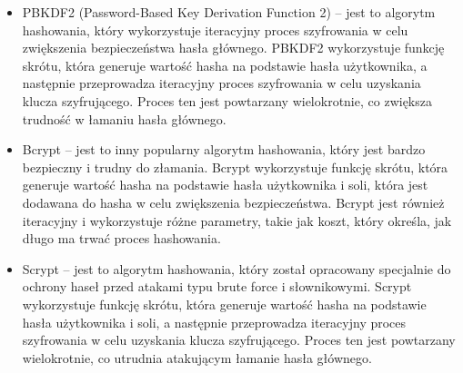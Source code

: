 \begin{itemize}
    \item PBKDF2 (Password-Based Key Derivation Function 2) – jest to algorytm hashowania, który wykorzystuje iteracyjny proces szyfrowania w celu zwiększenia bezpieczeństwa hasła głównego. PBKDF2 wykorzystuje funkcję skrótu, która generuje wartość hasha na podstawie hasła użytkownika, a następnie przeprowadza iteracyjny proces szyfrowania w celu uzyskania klucza szyfrującego. Proces ten jest powtarzany wielokrotnie, co zwiększa trudność w łamaniu hasła głównego.
    \item Bcrypt – jest to inny popularny algorytm hashowania, który jest bardzo bezpieczny i trudny do złamania. Bcrypt wykorzystuje funkcję skrótu, która generuje wartość hasha na podstawie hasła użytkownika i soli, która jest dodawana do hasha w celu zwiększenia bezpieczeństwa. Bcrypt jest również iteracyjny i wykorzystuje różne parametry, takie jak koszt, który określa, jak długo ma trwać proces hashowania.
    \item Scrypt – jest to algorytm hashowania, który został opracowany specjalnie do ochrony haseł przed atakami typu brute force i słownikowymi. Scrypt wykorzystuje funkcję skrótu, która generuje wartość hasha na podstawie hasła użytkownika i soli, a następnie przeprowadza iteracyjny proces szyfrowania w celu uzyskania klucza szyfrującego. Proces ten jest powtarzany wielokrotnie, co utrudnia atakującym łamanie hasła głównego.
\end{itemize}
